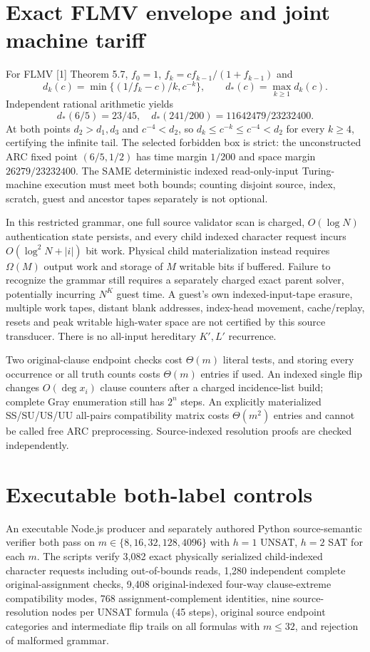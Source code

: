 \documentclass[11pt]{article}
\begin{document}
\section{Exact FLMV envelope and joint machine tariff}
For FLMV [1] Theorem 5.7, $f_0=1$, $f_k=cf_{k-1}/(1+f_{k-1})$ and
\[
 d_k(c)=\min\{(1/f_k-c)/k,c^{-k}\},\qquad d_*(c)=\max_{k\ge1}d_k(c).
\]
Independent rational arithmetic yields
\[
 d_*(6/5)=23/45,\quad
 d_*(241/200)=11642479/23232400.
\]
At both points $d_2>d_1,d_3$ and $c^{-4}<d_2$, so $d_k\le c^{-k}\le c^{-4}<d_2$ for every $k\ge4$, certifying the infinite tail. The selected forbidden box is strict: the unconstructed ARC fixed point $(6/5,1/2)$ has time margin $1/200$ and space margin $26279/23232400$. The SAME deterministic indexed read-only-input Turing-machine execution must meet both bounds; counting disjoint source, index, scratch, guest and ancestor tapes separately is not optional.

In this restricted grammar, one full source validator scan is charged, $O(\log N)$ authentication state persists, and every child indexed character request incurs $O(\log^2N+|i|)$ bit work. Physical child materialization instead requires $\Omega(M)$ output work and storage of $M$ writable bits if buffered. Failure to recognize the grammar still requires a separately charged exact parent solver, potentially incurring $N^K$ guest time. A guest's own indexed-input-tape erasure, multiple work tapes, distant blank addresses, index-head movement, cache/replay, resets and peak writable high-water space are not certified by this source transducer. There is no all-input hereditary $K',L'$ recurrence.

Two original-clause endpoint checks cost $\Theta(m)$ literal tests, and storing every occurrence or all truth counts costs $\Theta(m)$ entries if used. An indexed single flip changes $O(\deg x_i)$ clause counters after a charged incidence-list build; complete Gray enumeration still has $2^n$ steps. An explicitly materialized SS/SU/US/UU all-pairs compatibility matrix costs $\Theta(m^2)$ entries and cannot be called free ARC preprocessing. Source-indexed resolution proofs are checked independently.

\section{Executable both-label controls}
An executable Node.js producer and separately authored Python source-semantic verifier both pass on $m\in\{8,16,32,128,4096\}$ with $h=1$ UNSAT, $h=2$ SAT for each $m$. The scripts verify 3,082 exact physically serialized child-indexed character requests including out-of-bounds reads, 1,280 independent complete original-assignment checks, 9,408 original-indexed four-way clause-extreme compatibility modes, 768 assignment-complement identities, nine source-resolution nodes per UNSAT formula (45 steps), original source endpoint categories and intermediate flip trails on all formulas with $m\le32$, and rejection of malformed grammar.
\end{document}
